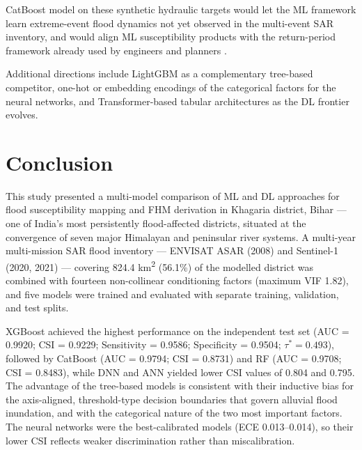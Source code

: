 \documentclass[12pt, a4paper]{article}
\begin{document}
CatBoost model on these synthetic hydraulic targets would let the ML framework learn extreme-event flood dynamics not yet observed in the multi-event SAR inventory, and would align ML susceptibility products with the return-period framework already used by engineers and planners \citep{neal2021, teng2017}.

Additional directions include LightGBM \citep{ke2017} as a complementary tree-based competitor, one-hot or embedding encodings of the categorical factors for the neural networks, and Transformer-based tabular architectures \citep{Gorishniy2021} as the DL frontier evolves.

\section{Conclusion}

This study presented a multi-model comparison of ML and DL approaches for flood susceptibility mapping and FHM derivation in Khagaria district, Bihar --- one of India's most persistently flood-affected districts, situated at the convergence of seven major Himalayan and peninsular river systems. A multi-year multi-mission SAR flood inventory --- ENVISAT ASAR (2008) and Sentinel-1 (2020, 2021) --- covering 824.4 km\textsuperscript{2} (56.1\%) of the modelled district was combined with fourteen non-collinear conditioning factors (maximum VIF 1.82), and five models were trained and evaluated with separate training, validation, and test splits.

XGBoost achieved the highest performance on the independent test set (AUC = 0.9920; CSI = 0.9229; Sensitivity = 0.9586; Specificity = 0.9504; $\tau^* = 0.493$), followed by CatBoost (AUC = 0.9794; CSI = 0.8731) and RF (AUC = 0.9708; CSI = 0.8483), while DNN and ANN yielded lower CSI values of 0.804 and 0.795. The advantage of the tree-based models is consistent with their inductive bias for the axis-aligned, threshold-type decision boundaries that govern alluvial flood inundation, and with the categorical nature of the two most important factors. The neural networks were the best-calibrated models (ECE 0.013--0.014), so their lower CSI reflects weaker discrimination rather than miscalibration.
\end{document}
